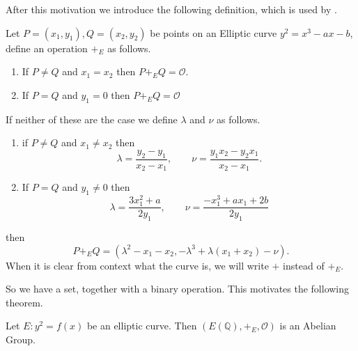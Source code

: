 After this motivation we introduce the following definition,
which is used by \cite[section 1.4]{silvermanRationalPoints}.
\begin{definition} \label{def:groupLaw}
  Let $P = (x_1, y_1), Q = (x_2, y_2)$ be points on an Elliptic curve $y^2 = x^3 - ax - b$, define an operation $+_E$ as follows.
  \begin{enumerate}
    \item If $P \neq Q$ and $x_1 = x_2$ then $P +_E Q = \mathcal{O}$.
    \item If $P = Q$ and $y_1 = 0$ then $P +_E Q = \mathcal{O}$
  \end{enumerate}
  If neither of these are the case we define $\lambda$ and $\nu$ as follows.
  \begin{enumerate}
    \item if $P \neq Q$ and $x_1 \neq x_2$
      then
      \[ \lambda = \frac{y_2 - y_1}{x_2 - x_1},\qquad \nu = \frac{y_1x_2 - y_2 x_1}{x_2 - x_1}.\]
    \item If $P = Q$ and $y_1 \neq 0$ then
      \[ \lambda = \frac{3x_1^2 + a}{2y_1},\qquad \nu = \frac{-x_1^3 + ax_1 + 2b}{2y_1} \]
  \end{enumerate}
  then
  \[ P +_E Q = (\lambda^2 - x_1 - x_2, -\lambda^3 + \lambda (x_1 + x_2) - \nu). \]
  When it is clear from context what the curve is, we will write $+$ instead of $+_E$.
\end{definition}
So we have a set, together with a binary operation. This
motivates the following theorem.
\begin{theorem}
  Let $E: y^2 = f(x)$ be an elliptic curve. Then
  $(E(\mathbb{Q}), +_E, \mathcal{O})$ is an Abelian Group.
\end{theorem}
